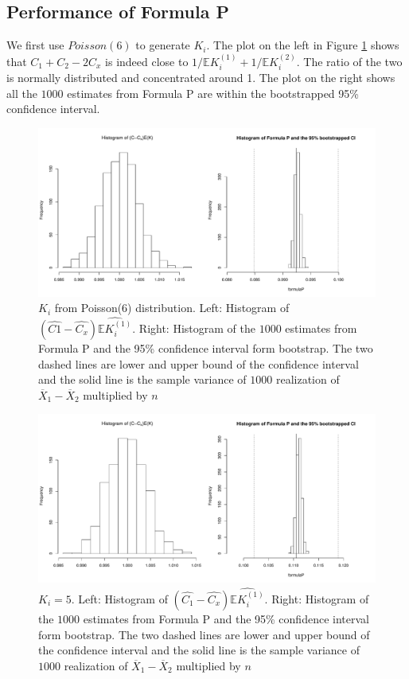 \documentclass[11pt]{asaproc}
\newcommand{\wht}{\widehat}
\newcommand{\bbe}{\mathbb{E}}
\newcommand{\xbar}{\overline{X}}
\begin{document}
\subsection{Performance of Formula P}
We first use $Poisson(6)$ to generate $K_i$. The plot on the left in Figure \ref{fig:kpois6} shows that $C_1+C_2-2C_x$ is indeed close to $1/\bbe K_i^{(1)}+1/\bbe K_i^{(2)}$. The ratio of the two is normally distributed and concentrated around 1. The plot on the right shows all the $1000$ estimates from Formula P are within the bootstrapped 95\% confidence interval.
\begin{figure}[!hbtp]
  \centering
  \includegraphics[width=.9\textwidth]{kpois6}
  \caption{$K_i$ from Poisson(6) distribution. Left: Histogram of $(\wht{C1}-\wht{C_x})\wht{\bbe K_i^{(1)}}$. Right: Histogram of the $1000$ estimates from Formula P and the 95\% confidence interval form bootstrap. The two dashed lines are lower and upper bound of the confidence interval and the solid line is the sample variance of $1000$ realization of $\xbar_1-\xbar_2$ multiplied by $n$}
  \label{fig:kpois6}
\end{figure}
\begin{figure}[!htbp]
  \centering
  \includegraphics[width=.9\textwidth]{kfixed5}
    \caption{$K_i=5$. Left: Histogram of $(\wht{C_1}-\wht{C_x})\wht{\bbe K_i^{(1)}}$. Right: Histogram of the $1000$ estimates from Formula P and the 95\% confidence interval form bootstrap. The two dashed lines are lower and upper bound of the confidence interval and the solid line is the sample variance of $1000$ realization of $\xbar_1-\xbar_2$ multiplied by $n$}
  \label{fig:kfixed5}
\end{figure}
\end{document}
